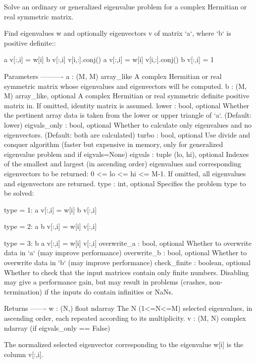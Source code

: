 \begin{DoxyVerb}Solve an ordinary or generalized eigenvalue problem for a complex
Hermitian or real symmetric matrix.

Find eigenvalues w and optionally eigenvectors v of matrix `a`, where
`b` is positive definite::

                  a v[:,i] = w[i] b v[:,i]
    v[i,:].conj() a v[:,i] = w[i]
    v[i,:].conj() b v[:,i] = 1

Parameters
----------
a : (M, M) array_like
    A complex Hermitian or real symmetric matrix whose eigenvalues and
    eigenvectors will be computed.
b : (M, M) array_like, optional
    A complex Hermitian or real symmetric definite positive matrix in.
    If omitted, identity matrix is assumed.
lower : bool, optional
    Whether the pertinent array data is taken from the lower or upper
    triangle of `a`. (Default: lower)
eigvals_only : bool, optional
    Whether to calculate only eigenvalues and no eigenvectors.
    (Default: both are calculated)
turbo : bool, optional
    Use divide and conquer algorithm (faster but expensive in memory,
    only for generalized eigenvalue problem and if eigvals=None)
eigvals : tuple (lo, hi), optional
    Indexes of the smallest and largest (in ascending order) eigenvalues
    and corresponding eigenvectors to be returned: 0 <= lo <= hi <= M-1.
    If omitted, all eigenvalues and eigenvectors are returned.
type : int, optional
    Specifies the problem type to be solved:

       type = 1: a   v[:,i] = w[i] b v[:,i]

       type = 2: a b v[:,i] = w[i]   v[:,i]

       type = 3: b a v[:,i] = w[i]   v[:,i]
overwrite_a : bool, optional
    Whether to overwrite data in `a` (may improve performance)
overwrite_b : bool, optional
    Whether to overwrite data in `b` (may improve performance)
check_finite : boolean, optional
    Whether to check that the input matrices contain only finite numbers.
    Disabling may give a performance gain, but may result in problems
    (crashes, non-termination) if the inputs do contain infinities or NaNs.

Returns
-------
w : (N,) float ndarray
    The N (1<=N<=M) selected eigenvalues, in ascending order, each
    repeated according to its multiplicity.
v : (M, N) complex ndarray
    (if eigvals_only == False)

    The normalized selected eigenvector corresponding to the
    eigenvalue w[i] is the column v[:,i].


\end{DoxyVerb}
